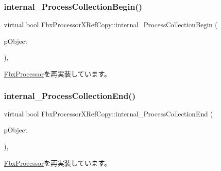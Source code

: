 \subsubsection{\texorpdfstring{internal\+\_\+\+Process\+Collection\+Begin()}{internal\_ProcessCollectionBegin()}}
{\footnotesize\ttfamily virtual bool Fbx\+Processor\+X\+Ref\+Copy\+::internal\+\_\+\+Process\+Collection\+Begin (\begin{DoxyParamCaption}\item[{\hyperlink{class_fbx_collection}{Fbx\+Collection} $\ast$}]{p\+Object }\end{DoxyParamCaption})\hspace{0.3cm}{\ttfamily [protected]}, {\ttfamily [virtual]}}



\hyperlink{class_fbx_processor_aae65d06b0e0f7865eaaa803a4009d536}{Fbx\+Processor}を再実装しています。

\mbox{\label{class_fbx_processor_x_ref_copy_ab85bf2d36c443dff93731836493cdfdf}} 
\subsubsection{\texorpdfstring{internal\+\_\+\+Process\+Collection\+End()}{internal\_ProcessCollectionEnd()}}
{\footnotesize\ttfamily virtual bool Fbx\+Processor\+X\+Ref\+Copy\+::internal\+\_\+\+Process\+Collection\+End (\begin{DoxyParamCaption}\item[{\hyperlink{class_fbx_collection}{Fbx\+Collection} $\ast$}]{p\+Object }\end{DoxyParamCaption})\hspace{0.3cm}{\ttfamily [protected]}, {\ttfamily [virtual]}}



\hyperlink{class_fbx_processor_ae578a3b99db2133b967b0ed29ce37e96}{Fbx\+Processor}を再実装しています。

\mbox{\label{class_fbx_processor_x_ref_copy_a268311daf5a2a29fc7bd2097d8346e5f}} 
